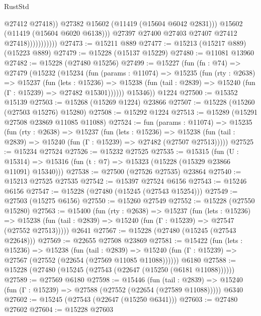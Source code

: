 \begin{lexlean}{RustStd}
\begin{coremodule}
                                  @27412
                                  @27418))
                              @27382
                              @15602
                              (@11419 (@15604 @6042 @2831)))
                            @15602
                            (@11419 (@15604 @6020 @6138)))
                          @27397
                          @27400
                          @27403
                          @27407
                          @27412
                          @27418)))))))))))
@27473 := @15211 @889
@27477 := @15213 (@15217 @889) (@15223 @889)
@27479 := @15228 (@15137 @15229)
@27480 := @11081 @13960
@27482 := @15228 (@27480 @15256)
@27499 := @15227
    (fun (fn : @74) =>
    @27479
      (@15232
        (@15234
          (fun (params : @11074) =>
          @15235
            (fun (rty : @2638) =>
            @15237
              (fun (lets : @15236) =>
              @15238 (fun (tail : @2839) => @15240 (fun (Γ : @15239) => @27482 @15301))))))
        @15346))
    @1224
@27500 := @15352 @15139
@27503 := @15268 (@15269 @1224) @23866
@27507 := @15228 (@15260 (@27503 @15276) @15280)
@27508 := @15292 @1224
@27513 := @15289 (@15291 @27508 @23869 @11085 @11088)
@27524 := fun (params : @11074) =>
  @15235
    (fun (rty : @2638) =>
    @15237
      (fun (lets : @15236) =>
      @15238 (fun (tail : @2839) => @15240 (fun (Γ : @15239) => @27482 (@27507 @27513)))))
@27525 := @15234 @27524
@27526 := @15232 @27525
@27535 := @15315
    (fun (U : @15314) => @15316 (fun (t : @7) => @15323 (@15228 (@15329 @23866 @11091) @15340)))
@27538 := @27500 (@27526 @27535) @23864
@27540 := @15213 @27525 @27535
@27542 := @15397 @27524 @6156
@27543 := @15246 @6156
@27547 := @15228 (@27480 (@15245 (@27543 @15254)))
@27549 := @27503 (@15275 @6156)
@27550 := @15260 @27549
@27552 := @15228 (@27550 @15280)
@27563 := @15400
    (fun (rty : @2638) =>
    @15237
      (fun (lets : @15236) =>
      @15238 (fun (tail : @2839) => @15240 (fun (Γ : @15239) => @27547 (@27552 @27513)))))
    @2641
@27567 := @15228 (@27480 (@15245 (@27543 @22648)))
@27569 := @22655 @27508 @23869
@27581 := @15422
    (fun (lets : @15236) =>
    @15238
      (fun (tail : @2839) =>
      @15240 (fun (Γ : @15239) => @27567 (@27552 (@22654 (@27569 @11085 @11088))))))
    @6180
@27588 := @15228 (@27480 (@15245 (@27543 (@22647 (@15250 (@6181 @11088))))))
@27589 := @27569 @6180
@27598 := @15446
    (fun (tail : @2839) => @15240 (fun (Γ : @15239) => @27588 (@27552 (@22654 (@27589 @11088)))))
    @6340
@27602 := @15245 (@27543 (@22647 (@15250 @6341)))
@27603 := @27480 @27602
@27604 := @15228 @27603

\end{coremodule}
\end{lexlean}
